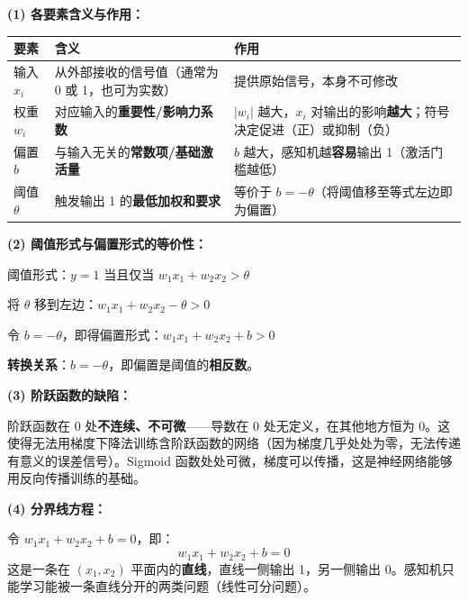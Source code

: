 \documentclass[a4paper,11pt]{ctexart}
\begin{document}
\begin{solutionbox}[参考答案与详细解析]
    \textbf{(1) 各要素含义与作用：}

    \begin{center}
    \begin{tabular}{p{2.5cm} p{4.5cm} p{5cm}}
        \toprule
        要素 & 含义 & 作用 \\
        \midrule
        输入 $x_i$ & 从外部接收的信号值（通常为 0 或 1，也可为实数） & 提供原始信号，本身不可修改 \\[0.8em]
        权重 $w_i$ & 对应输入的\textbf{重要性/影响力系数} & $|w_i|$ 越大，$x_i$ 对输出的影响\textbf{越大}；符号决定促进（正）或抑制（负） \\[0.8em]
        偏置 $b$ & 与输入无关的\textbf{常数项/基础激活量} & $b$ 越大，感知机越\textbf{容易}输出 1（激活门槛越低） \\[0.8em]
        阈值 $\theta$ & 触发输出 1 的\textbf{最低加权和要求} & 等价于 $b = -\theta$（将阈值移至等式左边即为偏置） \\
        \bottomrule
    \end{tabular}
    \end{center}

    \textbf{(2) 阈值形式与偏置形式的等价性：}

    阈值形式：$y = 1$ 当且仅当 $w_1 x_1 + w_2 x_2 > \theta$

    将 $\theta$ 移到左边：$w_1 x_1 + w_2 x_2 - \theta > 0$

    令 $b = -\theta$，即得偏置形式：$w_1 x_1 + w_2 x_2 + b > 0$

    \textbf{转换关系}：$b = -\theta$，即偏置是阈值的\textbf{相反数}。

    \textbf{(3) 阶跃函数的缺陷：}

    阶跃函数在 0 处\textbf{不连续、不可微}——导数在 0 处无定义，在其他地方恒为 0。这使得无法用梯度下降法训练含阶跃函数的网络（因为梯度几乎处处为零，无法传递有意义的误差信号）。Sigmoid 函数处处可微，梯度可以传播，这是神经网络能够用反向传播训练的基础。

    \textbf{(4) 分界线方程：}

    令 $w_1 x_1 + w_2 x_2 + b = 0$，即：
    \[
    w_1 x_1 + w_2 x_2 + b = 0
    \]
    这是一条在 $(x_1, x_2)$ 平面内的\textbf{直线}，直线一侧输出 1，另一侧输出 0。感知机只能学习能被一条直线分开的两类问题（线性可分问题）。
\end{solutionbox}
\end{document}
